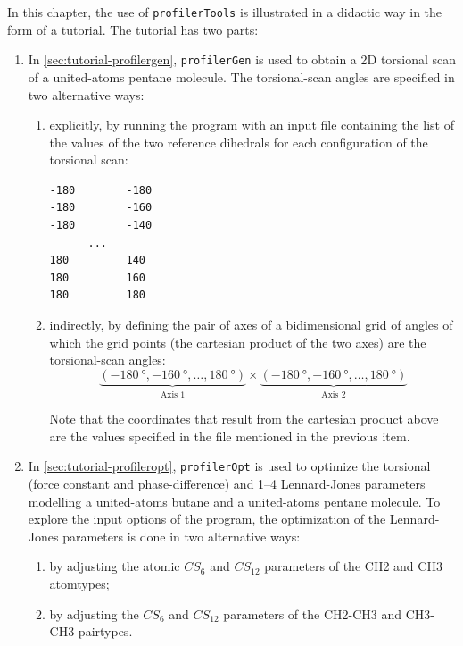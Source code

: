 \documentclass[10pt,a4paper,openany]{memoir}
\numberwithin{equation}{section}
\newcommand{\profileropt}[0]{\texttt{profilerOpt}}
\newcommand{\profilergen}[0]{\texttt{profilerGen}}
\newcommand{\profilertools}[0]{\texttt{profilerTools}}
\begin{document}
In this chapter, the use of \profilertools{} is illustrated in a didactic way in
the form of a tutorial.
%
The tutorial has two parts:
\begin{enumerate}

\item In \autoref{sec:tutorial-profilergen}, \profilergen{} is used to obtain a
  2D torsional scan of a united-atoms pentane molecule. The torsional-scan
  angles are specified in two alternative ways:

  \begin{enumerate}

  \item explicitly, by running the program with an input file containing the
    list of the values of the two reference dihedrals for each configuration of
    the torsional scan:

\begin{lstlisting}
-180        -180
-180        -160
-180        -140
      ...   
180         140
180         160
180         180
\end{lstlisting}

  \item indirectly, by defining the pair of axes of a bidimensional grid of
    angles of which the grid points (the cartesian product of the two axes)
    are the torsional-scan angles:
    $$\underbrace{(\SI{-180}{\degree},\SI{-160}{\degree},\ldots,\SI{180}{\degree})}_\text{Axis 1}
    \times
    \underbrace{(\SI{-180}{\degree},\SI{-160}{\degree},\ldots,\SI{180}{\degree})}_\text{Axis 2}$$

    Note that the coordinates that result from the cartesian product above are
    the values specified in the file mentioned in the previous item.

\end{enumerate}
  
\item In \autoref{sec:tutorial-profileropt}, \profileropt{} is used to optimize
  the torsional (force constant and phase-difference) and 1--4 Lennard-Jones
  parameters modelling a united-atoms butane and a united-atoms pentane
  molecule. To explore the input options of the program, the optimization of the
  Lennard-Jones parameters is done in two alternative ways:

  \begin{enumerate}
  \item by adjusting the atomic $CS_6$ and $CS_{12}$ parameters of the CH2
    and CH3 atomtypes;

  \item by adjusting the $CS_6$ and $CS_{12}$ parameters of the CH2-CH3 and
  CH3-CH3 pairtypes.

\end{enumerate}
\end{enumerate}
\end{document}
